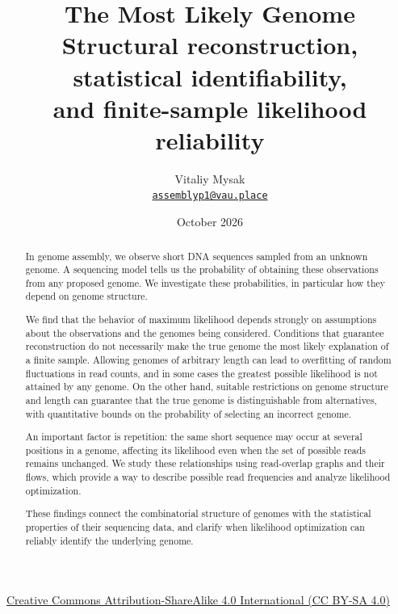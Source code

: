 \documentclass[11pt,a4paper]{article}
\title{\bfseries The Most Likely Genome\\[0.35em]
\large Structural reconstruction, statistical identifiability,\\
and finite-sample likelihood reliability}
\author{Vitaliy Mysak\\\href{mailto:assemblyp1@vau.place}{\texttt{assemblyp1@vau.place}}}
\date{October 2026}
\begin{document}
\maketitle
\begin{center}
\footnotesize
\href{https://creativecommons.org/licenses/by-sa/4.0/}{Creative Commons Attribution-ShareAlike 4.0 International (CC BY-SA 4.0)}
\end{center}
\begin{abstract}
\noindent
In genome assembly, we observe short DNA sequences sampled from an unknown genome. A sequencing model tells us the probability of obtaining these observations from any proposed genome. We investigate these probabilities, in particular how they depend on genome structure.

We find that the behavior of maximum likelihood depends strongly on assumptions about the observations and the genomes being considered. Conditions that guarantee reconstruction do not necessarily make the true genome the most likely explanation of a finite sample. Allowing genomes of arbitrary length can lead to overfitting of random fluctuations in read counts, and in some cases the greatest possible likelihood is not attained by any genome. On the other hand, suitable restrictions on genome structure and length can guarantee that the true genome is distinguishable from alternatives, with quantitative bounds on the probability of selecting an incorrect genome.

An important factor is repetition: the same short sequence may occur at several positions in a genome, affecting its likelihood even when the set of possible reads remains unchanged. We study these relationships using read-overlap graphs and their flows, which provide a way to describe possible read frequencies and analyze likelihood optimization.

These findings connect the combinatorial structure of genomes with the statistical properties of their sequencing data, and clarify when likelihood optimization can reliably identify the underlying genome.

\end{abstract}

\clearpage
\tableofcontents








\appendix







\clearpage
\printbibliography
\end{document}
